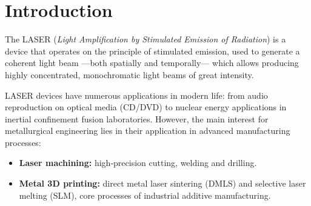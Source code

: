 \documentclass[12pt, a4paper]{article}
\begin{document}
\thispagestyle{plain}
\begin{abstract}
\noindent
This work explores the application of numerical series in the calculation of the optical gain
of a resonant laser cavity. The operating principle of lasers, their basic physical structure,
and the processes of spontaneous emission, absorption, and stimulated emission that govern
their operation are described. An analytical expression for the threshold gain is developed
from the Taylor series expansion of the exponential function, considering the reflection
losses at the cavity mirrors. It is shown that the linear approximation
$e^{-2\alpha L} \approx 1 - 2\alpha L$ is physically justified for the vast majority of
high‑reflectivity industrial lasers, and the truncation error is quantitatively analyzed.
The obtained result, $\alpha_c = (1 - R_1 R_2)/(2L)$, is directly useful in the design and
optimisation of high‑power lasers for advanced metallurgical manufacturing processes, such
as selective laser sintering (SLM), direct metal laser sintering (DMLS), and high‑precision
laser machining.

\medskip
\noindent\textbf{Keywords:} LASER, resonant cavity, optical gain, Taylor series,
threshold condition, laser manufacturing processes, metallurgical engineering.
\end{abstract}

\newpage
\tableofcontents
\newpage

\section{Introduction}

The LASER (\textit{Light Amplification by Stimulated Emission of Radiation}) is a device
that operates on the principle of stimulated emission, used to generate a coherent light
beam —both spatially and temporally— which allows producing highly concentrated, monochromatic
light beams of great intensity.

LASER devices have numerous applications in modern life: from audio reproduction on optical
media (CD/DVD) to nuclear energy applications in inertial confinement fusion laboratories.
However, the main interest for metallurgical engineering lies in their application in
advanced manufacturing processes:

\begin{itemize}[leftmargin=2em]
  \item \textbf{Laser machining:} high‑precision cutting, welding and drilling.
  \item \textbf{Metal 3D printing:} direct metal laser sintering (DMLS) and selective laser
        melting (SLM), core processes of industrial additive manufacturing.
\end{itemize}
\end{document}
